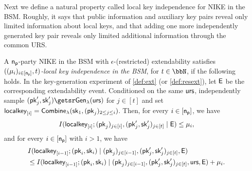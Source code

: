  Next we define a natural property called local key independence for NIKE in the BSM.
Roughly, it says that public information and auxiliary key pairs reveal only limited
information about local keys, and that adding one more independently generated key
pair reveals only limited additional information through the common URS. %
\begin{definition}
\label{def:localkeyind}
A $\mathsf{n_p}$-party NIKE in the BSM with $\epsilon$-(restricted) extendability satisfies
\emph{$((\mu_i)_{i\in[\mathsf{n_p}]},t)$-local key independence in the BSM}, for $t\in\N$, if the following holds. In the key-generation experiment of \cref{def:ext} (or \cref{def:resext}), let $\mathsf{E}$ be the corresponding extendability event. Conditioned on the same $\mathsf{urs}$, independently sample $(\pk_j',\sk_j')\getsr\Gen(\urs)$ for $j\in[t]$ and set $\mathsf{localkey}_{[i]}=\mathsf{Combine}_{\lambda}(\mathsf{sk}_1,(\mathsf{pk}_j)_{2\leq j\leq i})$. Then, for every $i\in[\mathsf{n_p}]$, we have
\[
I(\mathsf{localkey}_{[i]};(\mathsf{pk}_j)_{j\in[i]},(\mathsf{pk}_j',\mathsf{sk}_j')_{j \in [t]}\mid \mathsf{E})\leq \mu_i,
\]
and for every $i\in[\mathsf{n_p}]$ with $i>1$, we have
\[
\begin{split}
&I(\mathsf{localkey}_{[i-1]};(\mathsf{pk}_i,\mathsf{sk}_i)\mid(\mathsf{pk}_j)_{j\in[i-1]},(\mathsf{pk}_j',\mathsf{sk}_j')_{j\in[t]},\mathsf{E})\\
&\leq
I(\mathsf{localkey}_{[i-1]};(\mathsf{pk}_i,\mathsf{sk}_i)\mid(\mathsf{pk}_j)_{j\in[i-1]},(\mathsf{pk}_j',\mathsf{sk}_j')_{j\in[t]},\mathsf{urs},\mathsf{E})+\mu_i.
\end{split}
\]
\end{definition}


